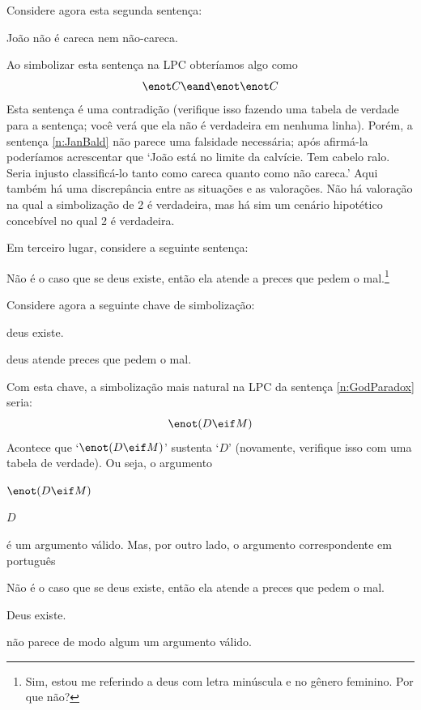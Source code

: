 Considere agora esta segunda sentença:
	\begin{earg} \setcounter{eargnum}{1}
		\item\label{n:JanBald} João não é careca nem não-careca.
	\end{earg}
Ao simbolizar esta sentença na LPC obteríamos algo como
$$\enot C \eand \enot \enot C$$
Esta sentença é uma contradição (verifique isso fazendo uma tabela de verdade para a sentença; você verá que ela não é verdadeira em nenhuma linha).
Porém, a sentença \ref{n:JanBald} não parece uma falsidade necessária; após afirmá-la poderíamos acrescentar que `João está no limite da calvície.
Tem cabelo ralo. Seria injusto classificá-lo tanto como careca quanto como não careca.'
Aqui também há uma discrepância entre as situações e as valorações.
Não há valoração na qual a simbolização de 2 é verdadeira, mas há sim um cenário hipotético concebível no qual 2 é verdadeira.

Em terceiro lugar, considere a seguinte sentença:
	\begin{earg}
\setcounter{eargnum}{2}	
		\item\label{n:GodParadox}	Não é o caso que se deus existe, então ela atende a preces que pedem o mal.\footnote{ Sim, estou me referindo a deus com letra minúscula e no gênero feminino. Por que não?}
	\end{earg}
Considere agora a seguinte chave de simbolização:
\begin{ekey}
	\item[D] deus existe.
	\item[M] deus atende preces que pedem o mal.
\end{ekey}
Com esta chave, a simbolização mais natural na LPC da sentença \ref{n:GodParadox} seria:
$$\enot (D \eif M)$$
Acontece que `$\enot (D \eif M)$' sustenta `$D$' (novamente, verifique isso com uma tabela de verdade).
Ou seja, o argumento
	\begin{earg}
		\item[] $\enot (D \eif M)$
		\item[\therefore] $D$
	\end{earg}
é um argumento válido.
Mas, por outro lado, o argumento correspondente em português
	\begin{earg}
		\item[] Não é o caso que se deus existe, então ela atende a preces que pedem o mal.
		\item[\therefore] Deus existe.
	\end{earg}
não parece de modo algum um argumento válido.

